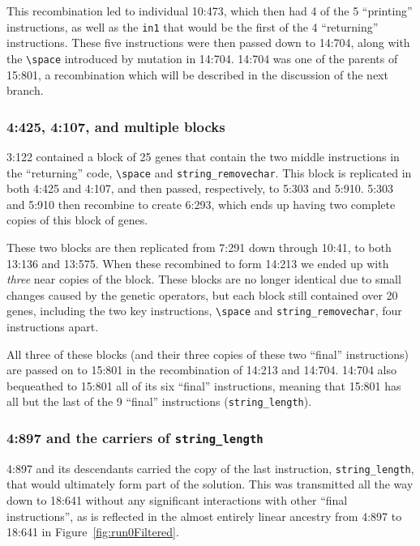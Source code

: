 This recombination
led to individual 10:473, which then had 4 of the 5 ``printing'' instructions,
as well as the \texttt{in1} that would be the first of the 4 ``returning''
instructions. These five instructions were then passed down to 14:704, 
along with the 
\texttt{\textbackslash space} introduced by mutation in 14:704. 14:704 was
one of the parents of 15:801, a recombination which will be described in the
discussion of the next branch.

\subsubsection{4:425, 4:107, and multiple blocks}
\label{sec:4:425}

3:122 contained a block of 25 genes %
that contain the two middle instructions in the ``returning''
code, \texttt{\textbackslash space} and \texttt{string\_removechar}.
This block is replicated in both 4:425 and 4:107, and then passed,
respectively, to 5:303 and 5:910. 5:303 and 5:910 then recombine
to create 6:293, which ends up having two complete copies of this
block of genes. %

These two blocks are then replicated from 7:291 down through 10:41,
to both 13:136 and 13:575. When these recombined to form 14:213
we ended up with \emph{three} near copies of the block. These blocks
are no longer identical due to small changes caused by the
genetic operators, but each block still contained over 20 genes,
including the two key instructions,
\texttt{\textbackslash space} and \texttt{string\_removechar},
four instructions apart.

All three of these blocks (and their three copies of these two ``final''
instructions) are passed on to 15:801 in the recombination of 14:213 and
14:704. 14:704 also bequeathed to 15:801 all of its six ``final'' 
instructions, meaning that 15:801 has all but the last of the 9 ``final''
instructions (\texttt{string\_length}).

\subsubsection{4:897 and the carriers of \texttt{string\_length}}
\label{sec:4:897}

4:897 and its descendants carried the copy of the last instruction, 
\texttt{string\_length}, that would ultimately form part of the solution. 
This was transmitted all the way down to
18:641 without any significant interactions with other ``final instructions'',
as is reflected in the almost entirely linear ancestry from 4:897 to 18:641 
in Figure~\ref{fig:run0Filtered}.

